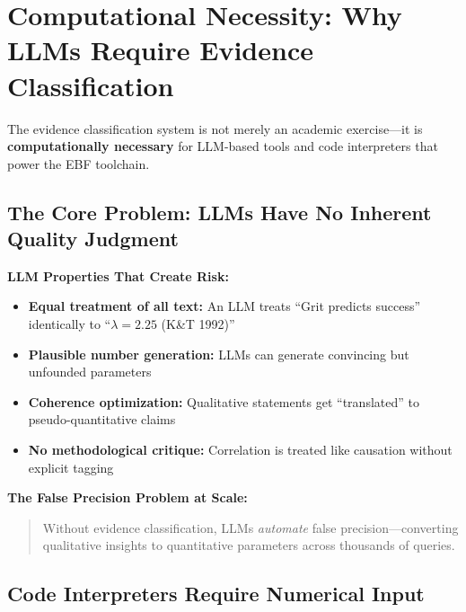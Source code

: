 \documentclass[11pt, a4paper]{article}
\begin{document}
\section{Computational Necessity: Why LLMs Require Evidence Classification}
\label{sec:evd-llm}

The evidence classification system is not merely an academic exercise---it is \textbf{computationally necessary} for LLM-based tools and code interpreters that power the EBF toolchain.

\subsection{The Core Problem: LLMs Have No Inherent Quality Judgment}

\begin{tcolorbox}[colback=red!5!white, colframe=red!75!black,
    title=Why LLMs Need Explicit Evidence Classification]

\textbf{LLM Properties That Create Risk:}
\begin{itemize}[nosep]
    \item \textbf{Equal treatment of all text:} An LLM treats ``Grit predicts success'' identically to ``$\lambda = 2.25$ (K\&T 1992)''
    \item \textbf{Plausible number generation:} LLMs can generate convincing but unfounded parameters
    \item \textbf{Coherence optimization:} Qualitative statements get ``translated'' to pseudo-quantitative claims
    \item \textbf{No methodological critique:} Correlation is treated like causation without explicit tagging
\end{itemize}

\textbf{The False Precision Problem at Scale:}
\begin{quote}
Without evidence classification, LLMs \textit{automate} false precision---converting qualitative insights to quantitative parameters across thousands of queries.
\end{quote}

\end{tcolorbox}

\subsection{Code Interpreters Require Numerical Input}
\end{document}

